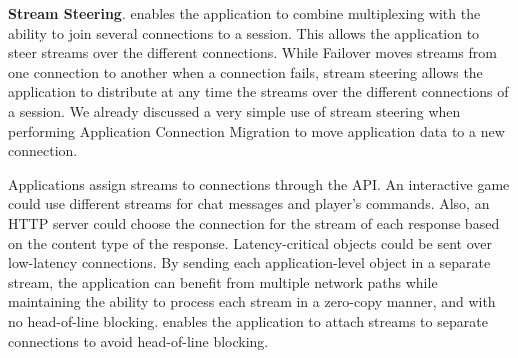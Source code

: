 
\textbf{Stream Steering}. \tcpls enables the application to combine
multiplexing with the ability to join several \tcp connections to a \tcpls
session. This allows the application to steer \tcpls streams over the different
\tcp connections. While Failover moves \tcpls streams from one connection to
another when a \tcp connection fails, stream steering allows the application to
distribute at any time the streams over the different \tcp connections of a
\tcpls session. We already discussed a very simple use of stream steering when
performing Application Connection Migration %
to move application data to a new connection.


Applications assign \tcpls streams to \tcp connections through the \tcpls API.
An interactive game could use different streams for chat messages and player's
commands.  Also, an HTTP server could choose the \tcp connection for the stream
of each response based on the content type of the response. Latency-critical
objects could be sent over low-latency connections. By sending each
application-level object in a separate stream, the application can benefit from
multiple network paths while maintaining the ability to process each stream in a
zero-copy manner, and with no head-of-line blocking. \tcpls enables the
application to attach streams to separate \tcp connections to avoid head-of-line blocking. %


